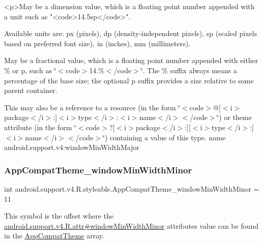 \begin{DoxyVerb}      <p>May be a dimension value, which is a floating point number appended with a unit such as "<code>14.5sp</code>".
\end{DoxyVerb}
 Available units are\+: px (pixels), dp (density-\/independent pixels), sp (scaled pixels based on preferred font size), in (inches), mm (millimeters). 

May be a fractional value, which is a floating point number appended with either \% or p, such as \char`\"{}$<$code$>$14.\%$<$/code$>$\char`\"{}. The \% suffix always means a percentage of the base size; the optional p suffix provides a size relative to some parent container. 

This may also be a reference to a resource (in the form \char`\"{}$<$code$>$@\mbox{[}$<$i$>$package$<$/i$>$\+:\mbox{]}$<$i$>$type$<$/i$>$\+:$<$i$>$name$<$/i$>$$<$/code$>$\char`\"{}) or theme attribute (in the form \char`\"{}$<$code$>$?\mbox{[}$<$i$>$package$<$/i$>$\+:\mbox{]}\mbox{[}$<$i$>$type$<$/i$>$\+:\mbox{]}$<$i$>$name$<$/i$>$$<$/code$>$\char`\"{}) containing a value of this type.  name android.\+support.\+v4\+:window\+Min\+Width\+Major \mbox{\label{classandroid_1_1support_1_1v4_1_1R_1_1styleable_a49209af19fab1feaef6b49e695bf15d0}} 
\subsubsection{\texorpdfstring{App\+Compat\+Theme\+\_\+window\+Min\+Width\+Minor}{AppCompatTheme\_windowMinWidthMinor}}
{\footnotesize\ttfamily int android.\+support.\+v4.\+R.\+styleable.\+App\+Compat\+Theme\+\_\+window\+Min\+Width\+Minor = 11\hspace{0.3cm}{\ttfamily [static]}}

This symbol is the offset where the \hyperlink{classandroid_1_1support_1_1v4_1_1R_1_1attr_a564927dd9bc70402dc96e92101cca431}{android.\+support.\+v4.\+R.\+attr\#window\+Min\+Width\+Minor} attribute\textquotesingle{}s value can be found in the \hyperlink{classandroid_1_1support_1_1v4_1_1R_1_1styleable_ac07ebbe62ed977f6dcaadc6397840ace}{App\+Compat\+Theme} array.

